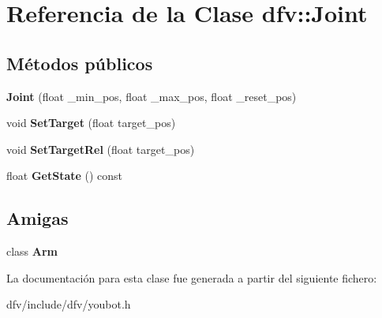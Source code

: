 \hypertarget{classdfv_1_1Joint}{\section{\-Referencia de la \-Clase dfv\-:\-:\-Joint}
\label{classdfv_1_1Joint}
}
\subsection*{\-Métodos públicos}
\begin{DoxyCompactItemize}
\item 
\hypertarget{classdfv_1_1Joint_a54091f5d84f8fe2ab23b1b65b1391c79}{{\bfseries \-Joint} (float \-\_\-min\-\_\-pos, float \-\_\-max\-\_\-pos, float \-\_\-reset\-\_\-pos)}\label{classdfv_1_1Joint_a54091f5d84f8fe2ab23b1b65b1391c79}

\item 
\hypertarget{classdfv_1_1Joint_a25d02a746863606558ac3f5d7734fa2b}{void {\bfseries \-Set\-Target} (float target\-\_\-pos)}\label{classdfv_1_1Joint_a25d02a746863606558ac3f5d7734fa2b}

\item 
\hypertarget{classdfv_1_1Joint_adbc75b951237c07bb22de5b43df53d82}{void {\bfseries \-Set\-Target\-Rel} (float target\-\_\-pos)}\label{classdfv_1_1Joint_adbc75b951237c07bb22de5b43df53d82}

\item 
\hypertarget{classdfv_1_1Joint_a748b34e8ff7b054868a2429f820bbf33}{float {\bfseries \-Get\-State} () const }\label{classdfv_1_1Joint_a748b34e8ff7b054868a2429f820bbf33}

\end{DoxyCompactItemize}
\subsection*{\-Amigas}
\begin{DoxyCompactItemize}
\item 
\hypertarget{classdfv_1_1Joint_a1e2513a45e0d7a76ba43fff0bdf44a65}{class {\bfseries \-Arm}}\label{classdfv_1_1Joint_a1e2513a45e0d7a76ba43fff0bdf44a65}

\end{DoxyCompactItemize}


\-La documentación para esta clase fue generada a partir del siguiente fichero\-:\begin{DoxyCompactItemize}
\item 
dfv/include/dfv/youbot.\-h\end{DoxyCompactItemize}
